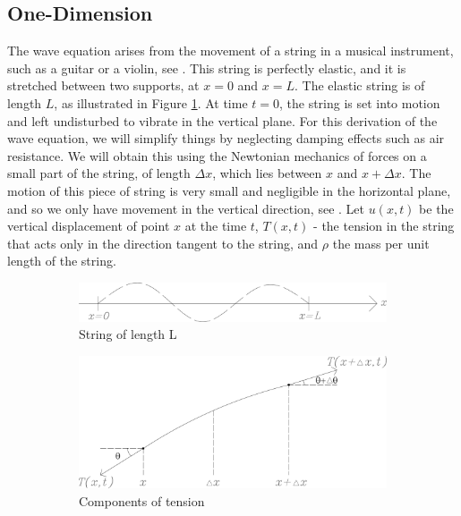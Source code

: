 \documentclass[a4paper, 12pt]{article}
\numberwithin{equation}{section}
\begin{document}
\subsection{One-Dimension}
The wave equation arises from the movement of a string in a musical instrument, such as a guitar or a violin, see
\cite{BoyDiP}. This string is perfectly elastic, and
it is stretched between two supports, at $x=0$ and $x=L$. The elastic string is of length $L$, as
illustrated in Figure \ref{fig:1a}. At time $t=0$, the string is set into motion and left undisturbed to vibrate in the
vertical plane. For this derivation of the wave equation, we will simplify things by neglecting damping 
effects such as air resistance. We will obtain this using the Newtonian
mechanics of forces on a small part of the string, of length $\Delta x$, which lies between $x$ and 
$x+\Delta x$. The motion of this piece of string is very small and negligible in the horizontal plane,
and so we only have movement
in the vertical direction, see \cite{Kr}. Let $u(x,t)$ be the vertical displacement of point $x$ at the time $t$, 
$T(x,t)$ - the tension in the string that acts only in the direction tangent to the string, and $\rho$ the 
mass per unit length of the string. 

\begin{figure}[h] 
    \begin{subfigure}[t]{0.5\textwidth} 
        \includegraphics[width=0.9\linewidth]{images/grafic-1.png} 
        \caption{String of length L}
        \label{fig:1a}
    \end{subfigure}
    \begin{subfigure}[t]{0.5\textwidth}
        \includegraphics[width=0.9\linewidth]{images/grafic-2.png}
        \caption{Components of tension}
        \label{fig:1b}
    \end{subfigure}     
\caption{}
\label{fig:1}
\end{figure}
\end{document}
